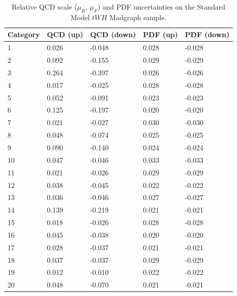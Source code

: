  \begin{table}[ht]
 \begin{center}
 \begin{tabular}{lllll}
 Category & QCD (up) & QCD (down) & PDF (up) & PDF (down) \\ \hline
1  &     0.026 &      -0.048 &   0.028 &    -0.028 \\
2  &     0.092 &      -0.155 &   0.029 &    -0.029 \\
3  &     0.264 &      -0.397 &   0.026 &    -0.026 \\
4  &     0.017 &      -0.025 &   0.028 &    -0.028 \\
5  &     0.052 &      -0.091 &   0.023 &    -0.023 \\
6  &     0.125 &      -0.197 &   0.020 &    -0.020 \\
7  &     0.021 &      -0.027 &   0.030 &    -0.030 \\
8  &     0.048 &      -0.074 &   0.025 &    -0.025 \\
9  &     0.090 &      -0.140 &   0.024 &    -0.024 \\
10 &     0.047 &      -0.046 &   0.033 &    -0.033 \\
11 &     0.021 &      -0.026 &   0.029 &    -0.029 \\
12 &     0.038 &      -0.045 &   0.022 &    -0.022 \\ \hline
13 &     0.036 &      -0.046 &   0.027 &    -0.027 \\
14 &     0.139 &      -0.219 &   0.021 &    -0.021 \\
15 &     0.018 &      -0.026 &   0.028 &    -0.028 \\
16 &     0.045 &      -0.038 &   0.020 &    -0.020 \\
17 &     0.028 &      -0.037 &   0.021 &    -0.021 \\
18 &     0.037 &      -0.037 &   0.029 &    -0.029 \\
19 &     0.012 &      -0.010 &   0.022 &    -0.022 \\
20 &     0.048 &      -0.070 &   0.021 &    -0.021 \\ \hline
 \hline
 \end{tabular}
 \end{center}
 \vspace{-0.5cm}
 \caption{Relative QCD scale ($\mu_R$, $\mu_F$) and PDF uncertainties on the Standard Model $tWH$ Madgraph sample.}
 \label{tab:qcdpdf_tWH}
 \end{table}



